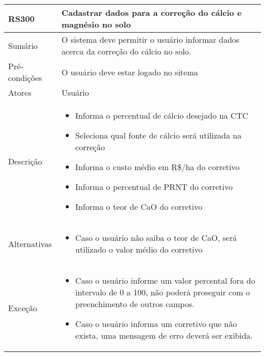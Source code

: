 \begin{quadro}[!htb]
    \begin{tabular}{|p{3cm}|p{11cm}|}
        \hline
        \textbf{RS300} & \textbf{Cadastrar dados para a correção do cálcio e magnésio no solo} \\
        \hline
        Sumário        & O sistema deve permitir o usuário informar dados acerca da correção do cálcio no solo.                  \\
        \hline
        Pré-condições  & O usuário deve estar logado no sitema                  \\
        \hline
        Atores         & Usuário                  \\
        \hline
        Descrição      &
        \begin{itemize}
            \item Informa o percentual de cálcio desejado na CTC
            \item Seleciona qual fonte de cálcio será utilizada na correção
            \item Informa o custo médio em R\$/ha do corretivo
            \item Informa o percentual de PRNT do corretivo
            \item Informa o teor de CaO do corretivo
        \end{itemize}                 \\
        \hline
        Alternativas   &
        \begin{itemize}
            \item Caso o usuário não saiba o teor de CaO, será utilizado o valor médio do corretivo
        \end{itemize}                 \\
        \hline
        Exceção        &
        \begin{itemize}
            \item Caso o usuário informe um valor percental fora do intervalo de 0 a 100, não poderá proseguir com o preenchimento de outros campos.
            \item Caso o usuário informa um corretivo que não exista, uma mensagem de erro deverá ser exibida.
        \end{itemize}                   \\
        \hline
    \end{tabular}
\end{quadro}

